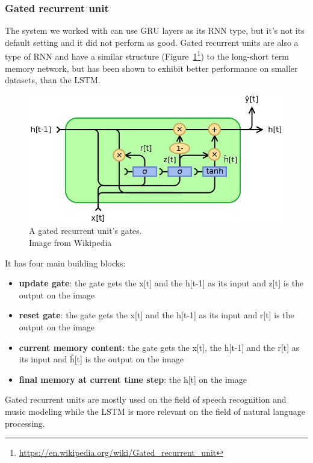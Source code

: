 \subsubsection{Gated recurrent unit}
The system we worked with can use GRU layers as its RNN type, but it's not its default setting and it did not perform as good.
Gated recurrent units are also a type of RNN and have a similar structure (Figure~\ref{fig:gru}\footnote{\url{https://en.wikipedia.org/wiki/Gated_recurrent_unit}}) to the long-short term memory network, but has been shown to exhibit better performance on smaller datasets, than the LSTM.
\begin{figure}[!htb]
	\centering
	\includegraphics[scale=0.5]{figures/gru.jpg}
	\caption{A gated recurrent unit's gates.\\Image from Wikipedia}
	\label{fig:gru}
\end{figure}

\begin{minipage}{\textwidth}
	It has four main building blocks:
	\begin{itemize}
		\item \textbf{update gate}: the gate gets the x[t] and the h[t-1] as its input and z[t] is the output on the image
		\item \textbf{reset gate}: the gate gets the x[t] and the h[t-1] as its input and r[t] is the output on the image
		\item \textbf{current memory content}: the gate gets the x[t], the h[t-1] and the r[t] as its input and \^{h}[t] is the output on the image
		\item \textbf{final memory at current time step}: the h[t] on the image
	\end{itemize}
\end{minipage}

Gated recurrent units are mostly used on the field of speech recognition and music modeling while the LSTM is more relevant on the field of natural language processing.

